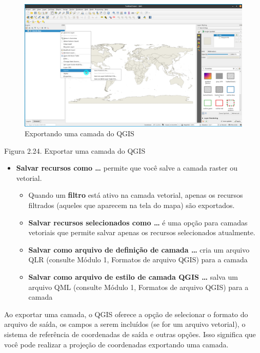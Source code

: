 \documentclass[
  portuguese,
]{krantz}
\begin{document}
\begin{figure}
\centering
\includegraphics{media/modulo2/exporting-layers.png}
\caption{Exportando uma camada do QGIS}
\end{figure}

Figura 2.24. Exportar uma camada do QGIS

\begin{itemize}
\item
  \textbf{Salvar recursos como \ldots{}} permite que você salve a camada raster ou vetorial.

  \begin{itemize}
  \item
    Quando um \textbf{filtro} está ativo na camada vetorial, apenas os recursos filtrados (aqueles que aparecem na tela do mapa) são exportados.
  \item
    \textbf{Salvar recursos selecionados como \ldots{}} é uma opção para camadas vetoriais que permite salvar apenas os recursos selecionados atualmente.
  \item
    \textbf{Salvar como arquivo de definição de camada \ldots{}} cria um arquivo QLR (consulte Módulo 1, Formatos de arquivo QGIS) para a camada
  \item
    \textbf{Salvar como arquivo de estilo de camada QGIS \ldots{}} salva um arquivo QML (consulte Módulo 1, Formatos de arquivo QGIS) para a camada
  \end{itemize}
\end{itemize}

Ao exportar uma camada, o QGIS oferece a opção de selecionar o formato do arquivo de saída, os campos a serem incluídos (se for um arquivo vetorial), o sistema de referência de coordenadas de saída e outras opções. Isso significa que você pode realizar a projeção de coordenadas exportando uma camada.
\end{document}
